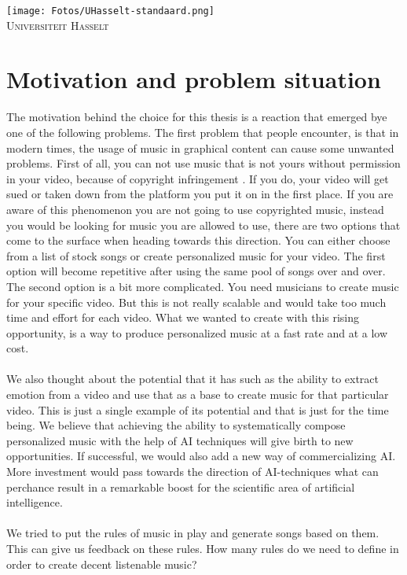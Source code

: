 \documentclass[a4paper]{article}
\begin{document}
\begin{titlepage}
	
	
	\vfill\vfill %
	

	\texttt{[image: Fotos/UHasselt-standaard.png]}\\[1cm] 
	\textsc{\large Universiteit Hasselt}\\[0.5cm]
	
	\vfill %
	
\end{titlepage}

\tableofcontents

\newpage
\section{Motivation and problem situation}

The motivation behind the choice for this thesis is a reaction that emerged bye one of the following problems. The first problem that people encounter, is that in modern times, the usage of music in graphical content can cause some unwanted problems. First of all, you can not use music that is not yours without permission in your video, because of copyright infringement \cite{copyright}. If you do, your video will get sued or taken down from the platform you put it on in the first place. If you are aware of this phenomenon you are not going to use copyrighted music, instead you would be looking for music you are allowed to use, there are two options that come to the surface when heading towards this direction. You can either choose from a list of stock songs or create personalized music for your video. The first option will become repetitive after using the same pool of songs over and over. The second option is a bit more complicated. You need musicians to create music for your specific video. But this is not really scalable and would take too much time and effort for each video. What we wanted to create with this rising opportunity, is a way to produce personalized music at a fast rate and at a low cost.
\\\\
We also thought about the potential that it has such as the ability to extract emotion from a video and use that as a base to create music for that particular video. This is just a single example of its potential and that is just for the time being. We believe that achieving the ability to systematically compose personalized music with the help of AI techniques will give birth to new opportunities. If successful, we would also add a new way of commercializing AI. More investment would pass towards the direction of AI-techniques what can perchance result in a remarkable boost for the scientific area of artificial intelligence.
\\\\
We tried to put the rules of music in play and generate songs based on them. This can give us feedback on these rules. How many rules do we need to define in order to create decent listenable music?
\end{document}
